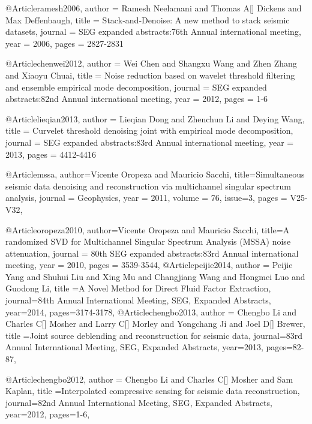 {@Article{ramesh2006,
  author = 	 {Ramesh Neelamani and Thomas A[] Dickens and Max Deffenbaugh},
  title = 	 {	
Stack‐and‐Denoise: A new method to stack seismic datasets},
  journal = 	 {SEG expanded abstracts:76th Annual international meeting},
  year = 	 2006,
  pages =	 {2827-2831}
}

@Article{chenwei2012,
  author = 	 {Wei Chen and Shangxu Wang and Zhen Zhang and Xiaoyu Chuai},
  title = 	 {Noise reduction based on wavelet threshold filtering and ensemble empirical mode decomposition},
  journal = 	 {SEG expanded abstracts:82nd Annual international meeting},
  year = 	 2012,
  pages =	 {1-6}
}

@Article{lieqian2013,
  author = 	 {Lieqian Dong and Zhenchun Li and Deying Wang},
  title = 	 {Curvelet threshold denoising joint with empirical mode decomposition},
  journal = 	 {SEG expanded abstracts:83rd Annual international meeting},
  year = 	 2013,
  pages =	 {4412-4416}
}



@Article{mssa,
  author={Vicente Oropeza and Mauricio Sacchi},
  title={Simultaneous seismic data denoising and reconstruction via multichannel singular spectrum analysis},
  journal = 	 {Geophysics},
  year = 	 2011,
  volume =	 76,
    issue=3,
  pages =	 {V25-V32},
}

@Article{oropeza2010,
  author={Vicente Oropeza and Mauricio Sacchi},
  title={A randomized SVD for Multichannel Singular Spectrum Analysis (MSSA) noise attenuation},
  journal = 	 {80th SEG expanded abstracts:83rd Annual international meeting},
  year = 	 2010,
  pages =	 {3539-3544},
}
@Article{peijie2014,
  author = {Peijie Yang and Shuhui Liu and Xing Mu and Changjiang Wang and Hongmei Luo and Guodong Li},
  title ={A Novel Method for Direct Fluid Factor Extraction},
  journal={84th Annual International Meeting, SEG, Expanded Abstracts},
  year=2014,
  pages={3174-3178},
}
@Article{chengbo2013,
  author = {Chengbo Li and Charles C[] Mosher and Larry C[] Morley and Yongchang Ji and Joel D[] Brewer},
  title ={Joint source deblending and reconstruction for seismic data},
  journal={83rd Annual International Meeting, SEG, Expanded Abstracts},
  year=2013,
  pages={82-87},
}

@Article{chengbo2012,
  author = {Chengbo Li and Charles C[] Mosher and Sam Kaplan},
  title ={Interpolated compressive sensing for seismic data reconstruction},
  journal={82nd Annual International Meeting, SEG, Expanded Abstracts},
  year=2012,
  pages={1-6},
}

}
